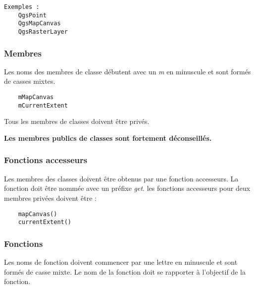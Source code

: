 \begin{verbatim}
Exemples :
	QgsPoint
	QgsMapCanvas
	QgsRasterLayer
\end{verbatim}

\subsubsection{Membres}
Les noms des membres de classe débutent avec un \textit{m} en minuscule et sont formés de casses mixtes.

\begin{verbatim}
	mMapCanvas	
	mCurrentExtent
\end{verbatim}

Tous les membres de classes doivent être privés.

\textbf{Les membres publics de classes sont fortement déconseillés.}

\subsubsection{Fonctions accesseurs}
Les membres des classes doivent être obtenus par une fonction accesseurs. La fonction doit être nommée avec un préfixe \textit{get}. les fonctions accesseurs pour deux membres privées doivent être :
\begin{verbatim}
	mapCanvas()
	currentExtent()
\end{verbatim}

\subsubsection{Fonctions}
Les noms de fonction doivent commencer par une lettre en minuscule et sont formés de casse mixte. Le nom de la fonction doit se rapporter à l'objectif de la fonction.

